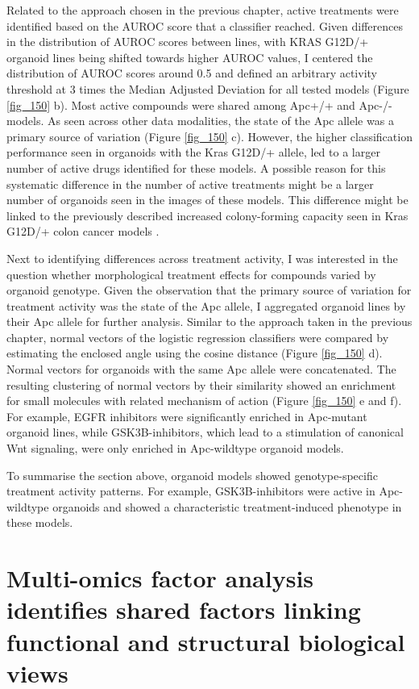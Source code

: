 \begin{flushleft}
\bigbreak
Related to the approach chosen in the previous chapter, active treatments were identified based on the AUROC score that a classifier reached. Given differences in the distribution of AUROC scores between lines, with KRAS G12D/+ organoid lines being shifted towards higher AUROC values, I centered the distribution of AUROC scores around 0.5 and defined an arbitrary activity threshold at 3 times the Median Adjusted Deviation for all tested models (Figure \ref{fig_150} b). Most active compounds were shared among Apc+/+ and Apc-/- models. As seen across other data modalities, the state of the Apc allele was a primary source of variation (Figure \ref{fig_150} c). However, the higher classification performance seen in organoids with the Kras G12D/+ allele, led to a larger number of active drugs identified for these models. A possible reason for this systematic difference in the number of active treatments might be a larger number of organoids seen in the images of these models. This difference might be linked to the previously described increased colony-forming capacity seen in Kras G12D/+ colon cancer models \cite{Patankar2019-ee}.

\bigbreak
Next to identifying differences across treatment activity, I was interested in the question whether morphological treatment effects for compounds varied by organoid genotype. Given the observation that the primary source of variation for treatment activity was the state of the Apc allele, I aggregated organoid lines by their Apc allele for further analysis. Similar to the approach taken in the previous chapter, normal vectors of the logistic regression classifiers were compared by estimating the enclosed angle using the cosine distance (Figure \ref{fig_150} d). Normal vectors for organoids with the same Apc allele were concatenated. The resulting clustering of normal vectors by their similarity showed an enrichment for small molecules with related mechanism of action (Figure \ref{fig_150} e and f). For example, EGFR inhibitors were significantly enriched in Apc-mutant organoid lines, while GSK3B-inhibitors, which lead to a stimulation of canonical Wnt signaling, were only enriched in Apc-wildtype organoid models.

\bigbreak
To summarise the section above, organoid models showed genotype-specific treatment activity patterns. For example, GSK3B-inhibitors were active in Apc-wildtype organoids and showed a characteristic treatment-induced phenotype in these models.

\section{Multi-omics factor analysis identifies shared factors linking functional and structural biological views}


\end{flushleft}
